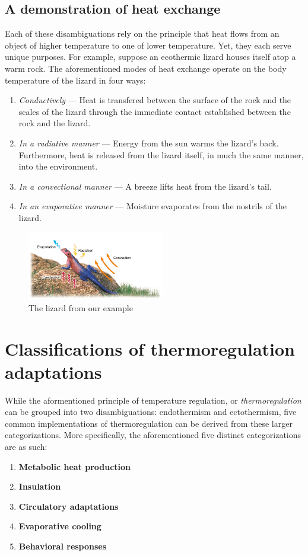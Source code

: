 \documentclass{article}
\begin{document}
\subsection{A demonstration of heat exchange}

Each of these disambiguations rely on the principle that heat flows from
an object of higher temperature to one of lower temperature. Yet, they
each serve unique purposes. For example, suppose an ecothermic lizard houses
itself atop a warm rock. The aforementioned modes of heat exchange operate on
the body temperature of the lizard in four ways:

\begin{enumerate}
	\item \emph{Conductively} --- Heat is transfered between the surface of the
		rock and the scales of the lizard through the immediate contact
		established between the rock and the lizard.
	\item \emph{In a radiative manner} --- Energy from the sun warms the
		lizard's back. Furthermore, heat is released from the lizard itself,
		in much the same manner, into the environment.
	\item \emph{In a convectional manner} --- A breeze lifts heat from the
		lizard's tail.
	\item \emph{In an evaporative manner} --- Moisture evaporates from the
		nostrils of the lizard.
\end{enumerate}

\begin{figure}[ht]
	\centering
	\includegraphics[width=6cm]{lizard_example.png}
	\caption{The lizard from our example}
\end{figure}

\pagebreak

\section{Classifications of thermoregulation adaptations}

While the aformentioned principle of temperature regulation, or
\emph{thermoregulation} can be grouped into two disambiguations: endothermism
and ectothermism, five common implementations of thermoregulation can be
derived from these larger categorizations. More specifically, the 
aforementioned five distinct categorizations are as such:

\begin{enumerate}
	\item \textbf{Metabolic heat production}
	\item \textbf{Insulation}
	\item \textbf{Circulatory adaptations}
	\item \textbf{Evaporative cooling}
	\item \textbf{Behavioral responses}
\end{enumerate}
\end{document}
